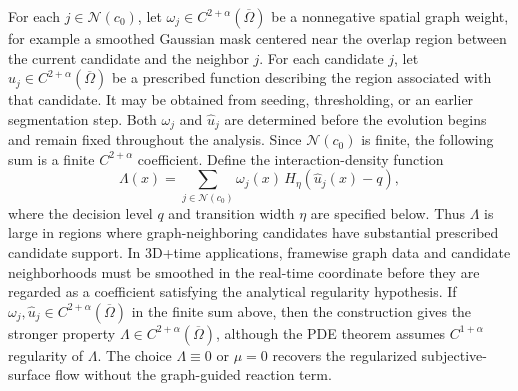 \documentclass[11pt]{article}
\theoremstyle{remark}
\newcommand{\cN}{\mathcal{N}}
\begin{document}
For each $j\in\cN(c_0)$, let $\omega_j\in C^{2+\alpha}(\overline\Omega)$ be a nonnegative spatial graph weight, for example a smoothed Gaussian mask centered near the overlap region between the current candidate and the neighbor $j$.  For each candidate $j$, let
$\widehat u_j\in C^{2+\alpha}(\overline\Omega)$
be a prescribed function describing the region associated with that candidate. It may be obtained from seeding, thresholding, or an earlier segmentation step. Both $\omega_j$ and $\widehat u_j$ are determined before the evolution begins and remain fixed throughout the analysis.
  Since $\cN(c_0)$ is finite, the following sum is a finite $C^{2+\alpha}$ coefficient.  Define the interaction-density function
\begin{equation}\label{eq:topology-density}
        \Lambda(x)=\sum_{j\in\cN(c_0)}\omega_j(x)\,H_\eta(\widehat u_j(x)-q),
\end{equation}
where the decision level $q$ and transition width $\eta$ are specified below.  Thus $\Lambda$ is large in regions where graph-neighboring candidates have substantial prescribed candidate support.  In 3D+time applications, framewise graph data and candidate neighborhoods must be smoothed in the real-time coordinate before they are regarded as a coefficient satisfying the analytical regularity hypothesis.  If $\omega_j,\widehat u_j\in C^{2+\alpha}(\overline\Omega)$ in the finite sum above, then the construction gives the stronger property $\Lambda\in C^{2+\alpha}(\overline\Omega)$, although the PDE theorem assumes $C^{1+\alpha}$ regularity of $\Lambda$.  The choice $\Lambda\equiv0$ or $\mu=0$ recovers the regularized subjective-surface flow without the graph-guided reaction term.
\end{document}
